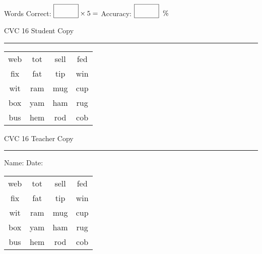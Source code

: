 \documentclass{memoir}
\begin{document}
\normalsize

Words Correct: $\fbox{\phantom{\huge 100}} \times 5 = $ Accuracy: $\fbox{\phantom{\huge 100}}\;\; \%$ 

\vfill

\newpage


\footnotesize \noindent
CVC 16 \hfill Student Copy
\smallskip
\hrule

\huge

\setlength{\tabcolsep}{14pt}
\def\arraystretch{2}

{\selectfont


\begin{vplace}[0.5]
\begin{center}
\begin{tabular}{cccc}
web & tot & sell & fed \\
fix & fat & tip & win \\
wit & ram & mug & cup \\
box & yam & ham & rug \\
bus & hem & rod & cob \\
\end{tabular}
\end{center}
\end{vplace}

}

\newpage

\footnotesize \noindent
CVC 16 \hfill Teacher Copy
\smallskip
\hrule

\normalsize

\vfill

\noindent
Name: \underline{\hspace{1.75in}} \hfill Date: \underline{\hspace{1in}}

\huge

{\selectfont


\begin{vplace}[0.5]
\begin{center}
\begin{tabular}{cccc}
web & tot & sell & fed \\
fix & fat & tip & win \\
wit & ram & mug & cup \\
box & yam & ham & rug \\
bus & hem & rod & cob \\
\end{tabular}
\end{center}
\end{vplace}



}
\end{document}
